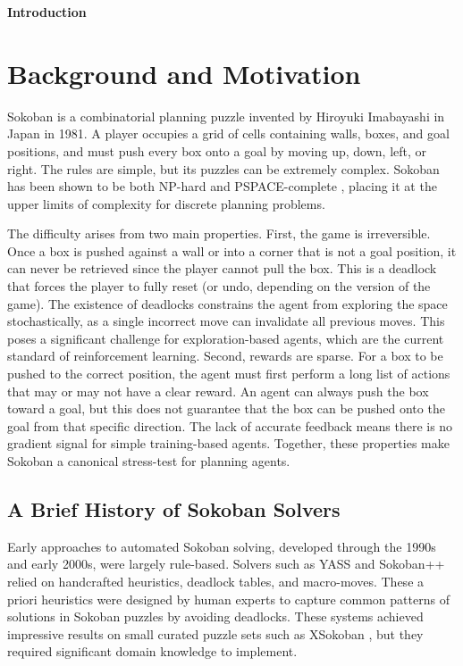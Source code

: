 \begin{center}
    \vspace{0.9cm}
    \textbf{Introduction}
\end{center}

\section*{Background and Motivation}

Sokoban is a combinatorial planning puzzle invented by Hiroyuki Imabayashi in Japan in 1981.
A player occupies a grid of cells containing walls, boxes, and goal positions, and must push
every box onto a goal by moving up, down, left, or right. The rules are simple, but its puzzles
can be extremely complex. Sokoban has been shown to be both NP-hard \cite{fryers1995sokoban}
and PSPACE-complete \cite{culberson1997sokoban}, placing it at the upper limits of complexity
for discrete planning problems.

The difficulty arises from two main properties. First, the game is irreversible. Once a box is
pushed against a wall or into a corner that is not a goal position, it can never be retrieved
since the player cannot pull the box. This is a deadlock that forces the player to fully reset
(or undo, depending on the version of the game).
The existence of deadlocks constrains the agent from exploring the space stochastically, as a
single incorrect move can invalidate all previous moves. This poses a significant challenge for
exploration-based agents, which are the current standard of reinforcement learning. Second, rewards
are sparse. For a box to be pushed to the correct position, the agent must first perform a long
list of actions that may or may not have a clear reward. An agent can always push the box toward a goal,
but this does not guarantee that the box can be pushed onto the goal from that specific direction.
The lack of accurate feedback means there is no gradient signal for simple training-based agents.
Together, these properties make Sokoban a canonical stress-test for planning agents.

\subsection*{A Brief History of Sokoban Solvers}

Early approaches to automated Sokoban solving, developed through the 1990s and early
2000s, were largely rule-based. Solvers such as YASS \cite{damgaard_yass} and Sokoban++ 
\cite{wits_sokobanpp} relied on handcrafted heuristics, deadlock tables, and macro-moves. 
These a priori heuristics were designed by human experts to capture common patterns of solutions 
in Sokoban puzzles by avoiding deadlocks. These systems achieved impressive results on small
curated puzzle sets such as XSokoban \cite{junghanns1999domain}, but they required significant
domain knowledge to implement.

